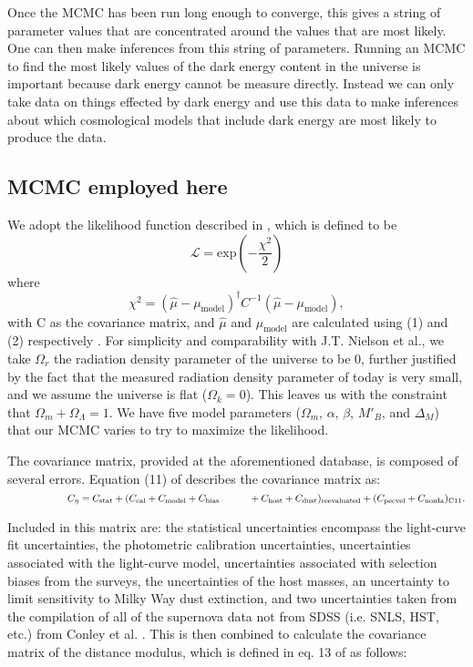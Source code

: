 \documentclass[aps,prl,reprint]{revtex4-1}
\begin{document}
Once the MCMC has been run long enough to converge, this gives a string of parameter values that are concentrated around the values that are most likely. One can then make inferences from this string of parameters. Running an MCMC to find the most likely values of the dark energy content in the universe is important because dark energy cannot be measure directly. Instead we can only take data on things effected by dark energy and use this data to make inferences about which cosmological models that include dark energy are most likely to produce the data.


\subsection{MCMC employed here}

\par We adopt the likelihood function described in \cite{sdss}, which is defined to be $$\mathscr{L} = \text{exp}(-\frac{\chi^2}{2}) $$ where$$\chi^2 = (\hat{\mu}-\mu_\text{model})^\dagger C^{-1} (\hat{\mu}-\mu_\text{model}),$$  with C as the covariance matrix, and $\hat{\mu}$ and $\mu_\text{model}$ are calculated using (1) and (2) respectively . For simplicity and comparability with J.T. Nielson et al., we take $\Omega_r$ the radiation density parameter of the universe to be 0, further justified by the fact that the measured radiation density parameter of today is very small, and we assume the universe is flat ($\Omega_k = 0$). This leaves us with the constraint that $\Omega_m + \Omega_{\Lambda} = 1 $. We have five model parameters ($\Omega_m$, $\alpha$, $\beta$, $M'_B$, and $\Delta_M$) that our MCMC varies to try to maximize the likelihood.
\par The covariance matrix, provided at the aforementioned database, is composed of several errors. Equation (11) of \cite{sdss} describes the covariance matrix as: \begin{math}  \newline \newline  \indent \indent \indent \indent  C_\eta = C_{\text{stat}} + (C_{\text{cal}} + C_{\text{model}} + C_{\text{bias}} \newline
\indent \indent  + C_{\text{host}} + C_{\text{dust}})_{\text{reevaluated}} + (C_{\text{pecvel}}+C_{\text{nonIa}})_{\text{C11}}.\end{math}
\newline \par Included in this matrix are: the statistical uncertainties encompass the light-curve fit uncertainties, the photometric calibration uncertainties, uncertainties associated with the light-curve model, uncertainties associated with selection biases from the surveys, the uncertainties of the host masses, an uncertainty to limit sensitivity to Milky Way dust extinction, and two uncertainties taken from the compilation of all of the supernova data not from SDSS (i.e. SNLS, HST, etc.) from Conley et al. \cite{c11}. This is then combined to calculate the covariance matrix of the distance modulus, which is defined in eq. 13 of \cite{sdss} as follows:
\end{document}
